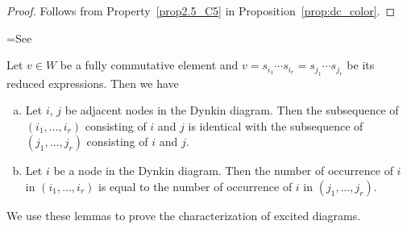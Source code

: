 \begin{proof}
Follows from Property~\ref{prop2.5_C5} in Proposition~\ref{prop:dc_color}.
\end{proof}

\setbox\toto=\hbox{See~\cite[Section~3]{GK}}
\begin{lemm}[\box\toto]
\label{lem:fc}
Let $v \in W$ be a fully commutative element 
and $v = s_{i_1} \cdots s_{i_r} = s_{j_1} \cdots s_{j_r}$ be its reduced expressions.
Then we have
\begin{enumerate}[(a)]
\item\label{lemma3.6_a} %
Let $i$, $j$ be adjacent nodes in the Dynkin diagram.
Then the subsequence of $(i_1, \ldots, i_r)$ consisting of $i$ and $j$ 
is identical with the subsequence of $(j_1, \ldots, j_r)$ consisting of $i$ and $j$.
\item\label{lemma3.6_b} %
Let $i$ be a node in the Dynkin diagram.
Then the number of occurrence of $i$ in $(i_1, \ldots, i_r)$ 
is equal to the number of occurrence of $i$ in $(j_1, \ldots, j_r)$.
\end{enumerate}
\end{lemm}

We use these lemmas to prove the characterization of excited diagrams.

